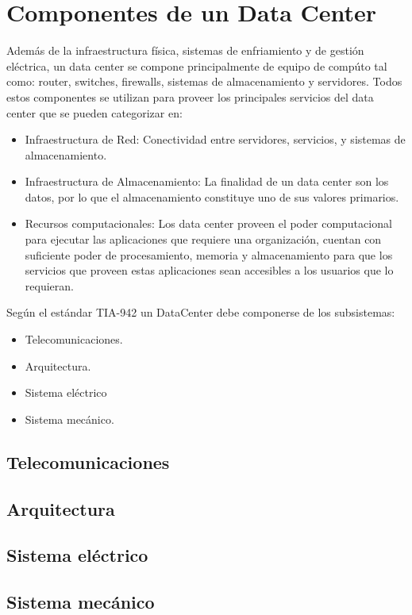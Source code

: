 \documentclass[journal]{IEEEtran}
\begin{document}
\section{Componentes de un Data Center}
Además de la infraestructura física, sistemas de enfriamiento y de gestión eléctrica, un data center se compone principalmente de equipo de compúto tal como:
router, switches, firewalls, sistemas de almacenamiento y servidores.
Todos estos componentes se utilizan para proveer los principales servicios del data center que se pueden categorizar en:
\begin{itemize}
  \item Infraestructura de Red: Conectividad entre servidores, servicios, y sistemas de almacenamiento.
  \item Infraestructura de Almacenamiento: La finalidad de un data center son los datos, por lo que el almacenamiento constituye uno de sus valores primarios.
  \item Recursos computacionales: Los data center proveen el poder computacional para ejecutar las aplicaciones que requiere una organización, cuentan con suficiente poder de procesamiento, memoria y almacenamiento para que 
  los servicios que proveen estas aplicaciones sean accesibles a los usuarios que lo requieran.
\end{itemize}
Según el estándar TIA-942 un DataCenter debe componerse de los subsistemas:
\begin{itemize}
  \item Telecomunicaciones.
  \item Arquitectura.
  \item Sistema eléctrico
  \item Sistema mecánico.
\end{itemize}

\subsection{Telecomunicaciones}
\subsection{Arquitectura}
\subsection{Sistema eléctrico}
\subsection{Sistema mecánico}
\end{document}
